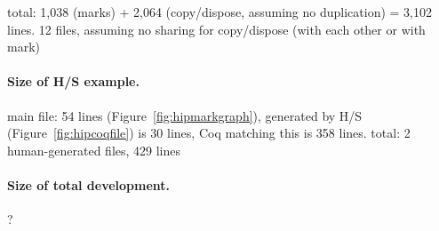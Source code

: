 {total: 1,038 (marks) + 2,064 (copy/dispose, assuming no duplication) = 3,102 lines.  12 files, assuming no sharing for copy/dispose (with each other or with mark)

\paragraph{Size of H/S example.}
main file: 54 lines (Figure~\ref{fig:hipmarkgraph}),  generated by H/S (Figure~\ref{fig:hipcoqfile}) is 30 lines, Coq  matching this  is 358 lines.
total: 2 human-generated files, 429 lines

\paragraph{Size of total development.} ?
}
